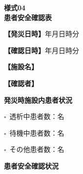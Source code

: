 \documentclass[a4paper,12pt]{jarticle}
\newcommand{\checkbox}{$\square$\ }
\newcommand{\underlinespace}[1]{\underline{\hspace{#1}}}
\begin{document}
\begin{center}
{\Large\textbf{様式04}}\\
\vspace{3mm}
{\Large\textbf{患者安全確認表}}
\end{center}
\vspace{5mm}

\noindent
\textbf{【発災日時】}\underlinespace{2cm}年\underlinespace{1cm}月\underlinespace{1cm}日\underlinespace{1cm}時\underlinespace{1cm}分

\vspace{3mm}

\noindent
\textbf{【確認日時】}\underlinespace{2cm}年\underlinespace{1cm}月\underlinespace{1cm}日\underlinespace{1cm}時\underlinespace{1cm}分

\vspace{3mm}

\noindent
\textbf{【施設名】} \underlinespace{10cm}

\vspace{3mm}

\noindent
\textbf{【確認者】} \underlinespace{10cm}

\vspace{8mm}

\begin{center}
\textbf{\large 発災時施設内患者状況}
\end{center}

\vspace{3mm}

\noindent
\checkbox 透析中患者数：\underlinespace{2cm}名

\vspace{2mm}

\noindent
\checkbox 待機中患者数：\underlinespace{2cm}名

\vspace{2mm}

\noindent
\checkbox その他患者数：\underlinespace{2cm}名

\vspace{8mm}

\begin{center}
\textbf{\large 患者安全確認状況}
\end{center}

\vspace{3mm}
\end{document}
